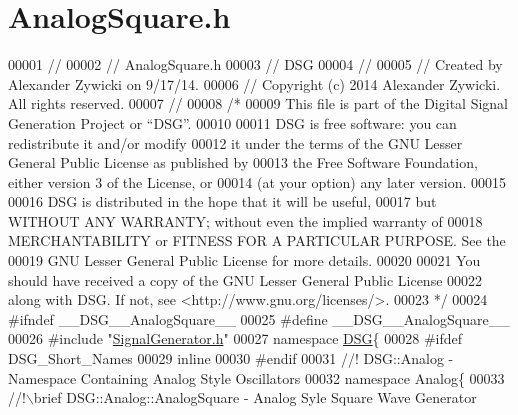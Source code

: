 \hypertarget{_analog_square_8h_source}{\section{Analog\+Square.\+h}
\label{_analog_square_8h_source}
}

\begin{DoxyCode}
00001 \textcolor{comment}{//}
00002 \textcolor{comment}{//  AnalogSquare.h}
00003 \textcolor{comment}{//  DSG}
00004 \textcolor{comment}{//}
00005 \textcolor{comment}{//  Created by Alexander Zywicki on 9/17/14.}
00006 \textcolor{comment}{//  Copyright (c) 2014 Alexander Zywicki. All rights reserved.}
00007 \textcolor{comment}{//}
00008 \textcolor{comment}{/*}
00009 \textcolor{comment}{ This file is part of the Digital Signal Generation Project or “DSG”.}
00010 \textcolor{comment}{}
00011 \textcolor{comment}{ DSG is free software: you can redistribute it and/or modify}
00012 \textcolor{comment}{ it under the terms of the GNU Lesser General Public License as published by}
00013 \textcolor{comment}{ the Free Software Foundation, either version 3 of the License, or}
00014 \textcolor{comment}{ (at your option) any later version.}
00015 \textcolor{comment}{}
00016 \textcolor{comment}{ DSG is distributed in the hope that it will be useful,}
00017 \textcolor{comment}{ but WITHOUT ANY WARRANTY; without even the implied warranty of}
00018 \textcolor{comment}{ MERCHANTABILITY or FITNESS FOR A PARTICULAR PURPOSE.  See the}
00019 \textcolor{comment}{ GNU Lesser General Public License for more details.}
00020 \textcolor{comment}{}
00021 \textcolor{comment}{ You should have received a copy of the GNU Lesser General Public License}
00022 \textcolor{comment}{ along with DSG.  If not, see <http://www.gnu.org/licenses/>.}
00023 \textcolor{comment}{ */}
00024 \textcolor{preprocessor}{#ifndef \_\_DSG\_\_AnalogSquare\_\_}
00025 \textcolor{preprocessor}{#define \_\_DSG\_\_AnalogSquare\_\_}
00026 \textcolor{preprocessor}{#include "\hyperlink{_signal_generator_8h}{SignalGenerator.h}"}
00027 \textcolor{keyword}{namespace }\hyperlink{namespace_d_s_g}{DSG}\{
00028 \textcolor{preprocessor}{#ifdef DSG\_Short\_Names}
00029     \textcolor{keyword}{inline}
00030 \textcolor{preprocessor}{#endif}
00031 \textcolor{comment}{    //! DSG::Analog - Namespace Containing Analog Style Oscillators}
00032 \textcolor{comment}{}    \textcolor{keyword}{namespace }Analog\{\textcolor{comment}{}
00033 \textcolor{comment}{        //!\(\backslash\)brief DSG::Analog::AnalogSquare - Analog Syle Square Wave Generator}

\end{DoxyCode}
